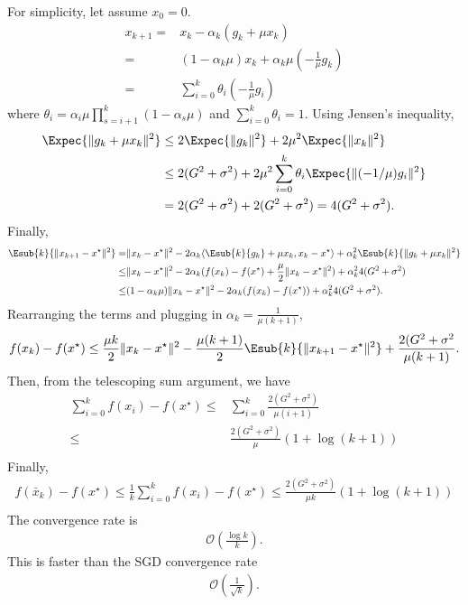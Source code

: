 \documentclass{article}
\begin{document}
For simplicity, let assume $x_0=0$.
\begin{align}
    x_{k+1} =& x_k - \alpha_k (g_k + \mu x_k)\\
    =& (1-\alpha_k \mu)x_k + \alpha_k \mu (-\frac{1}{\mu}g_k)\\
    =& \sum_{i=0}^k \theta_i (-\frac{1}{\mu} g_i)
\end{align}
where $\theta_i = \alpha_i \mu\prod_{s=i+1}^k(1-\alpha_s \mu) $ and $\sum_{i=0}^k \theta_i = 1$.
Using Jensen's inequality,
\begin{align}
    \Expec{\|g_k + \mu x_k\|^2}
    &\leq 2\Expec{\|g_k\|^2} + 2 \mu^2 \Expec{\|x_k\|^2}\\
    &\leq 2(G^2+\sigma^2) + 2 \mu^2 \sum_{i=0}^k \theta_i \Expec{\|(-1/\mu)g_i\|^2}\\
    &= 2(G^2+\sigma^2) + 2(G^2+\sigma^2) = 4(G^2+\sigma^2).
\end{align}
Finally,
\begin{align}
    \Esub{k}{\|x_{k+1}-x^\star\|^2}
    =& \|x_k-x^\star\|^2 - 2\alpha_k\langle \Esub{k}{g_k} + \mu x_k, x_k-x^\star\rangle + \alpha_k^2 \Esub{k}{\|g_k+\mu x_k\|^2}\\
    \leq & \|x_k-x^\star\|^2 - 2\alpha_k (f(x_k) - f(x^\star) + \frac{\mu}{2} \|x_k-x^\star\|^2) + \alpha_k^2 4(G^2+\sigma^2)\\
    \leq & (1-\alpha_k \mu) \|x_k-x^\star\|^2 - 2\alpha_k (f(x_k) - f(x^\star)) + \alpha_k^2 4(G^2+\sigma^2).
\end{align}
Rearranging the terms and plugging in $\alpha_k = \frac{1}{\mu(k+1)}$, 
\begin{align}
    f(x_k)- f(x^\star) \leq \frac{\mu k}{2} \|x_k-x^\star\|^2 - \frac{\mu (k+1)}{2} \Esub{k}{\|x_{k+1}-x^\star\|^2} 
    + \frac{2(G^2+\sigma^2}{\mu(k+1)}.
\end{align}
Then, from the telescoping sum argument, we have
\begin{align}
    \sum_{i=0}^k f(x_i)- f(x^\star) 
    \leq&  \sum_{i=0}^k  \frac{2(G^2+\sigma^2)}{\mu(i+1)}\\
    \leq&  \frac{2(G^2+\sigma^2)}{\mu} (1+\log (k+1))\\
\end{align}
Finally,
\begin{align}
    f(\bar{x}_k) - f(x^\star) \leq \frac{1}{k} \sum_{i=0}^k f(x_i)- f(x^\star) 
    \leq  \frac{2(G^2+\sigma^2)}{\mu k} (1+\log (k+1))\\
\end{align}
The convergence rate is
\begin{align}
    \mathcal{O}\left(\frac{\log k}{k}\right).
\end{align}
This is faster than the SGD convergence rate 
\begin{align}
    \mathcal{O}\left(\frac{1}{\sqrt{k}}\right).
\end{align}
\end{document}
